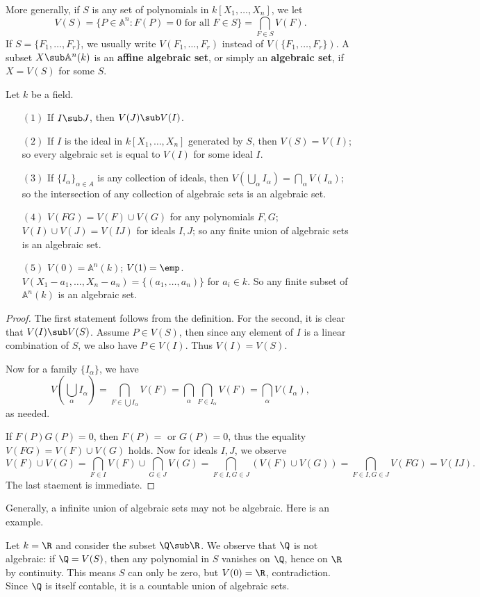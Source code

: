 More generally, if $S$ is any set of polynomials in $k[X_1,\dots,X_n]$, we let 
\[V(S)=\{P\in\mathbb{A}^n:F(P)=0\text{ for all }F\in S\}=\bigcap_{F\in S}V(F).\]
If $S=\{F_1,\dots,F_r\}$, we usually write $V(F_1,\dots,F_r)$ instead of $V(\{F_1,\dots,F_r\})$. A subset $X\sub\mathbb{A}^n(k)$ is an \textbf{affine algebraic set}, or simply an \textbf{algebraic set}, if $X=V(S)$ for some $S$.
\begin{proposition}
Let $k$ be a field.
\begin{itemize}
\item[$(1)$] If $I\sub J$, then $V(J)\sub V(I)$.
\item[$(2)$] If $I$ is the ideal in $k[X_1,\dots,X_n]$ generated by $S$, then $V(S)=V(I)$; so every algebraic set is equal to $V(I)$ for some ideal $I$.
\item[$(3)$] If $\{I_\alpha\}_{\alpha\in A}$ is any collection of ideals, then $V(\bigcup_\alpha I_\alpha)=\bigcap_\alpha V(I_\alpha)$; so the intersection of any collection of algebraic sets is an algebraic set. 
\item[$(4)$] $V(FG)=V(F)\cup V(G)$ for any polynomials $F,G$; $V(I)\cup V(J)=V(IJ)$ for ideals $I,J$; so any finite union of algebraic sets is an algebraic set.
\item[$(5)$] $V(0)=\mathbb{A}^n(k)$; $V(1)=\emp$. $V(X_1-a_1,\dots,X_n-a_n)=\{(a_1,\dots,a_n)\}$ for $a_i\in k$. So any finite subset of $\mathbb{A}^n(k)$ is an algebraic set.
\end{itemize}
\end{proposition}
\begin{proof}
The first statement follows from the definition. For the second, it is clear that $V(I)\sub V(S)$. Assume $P\in V(S)$, then since any element of $I$ is a linear combination of $S$, we also have $P\in V(I)$. Thus $V(I)=V(S)$.\par
Now for a family $\{I_\alpha\}$, we have
\[V(\bigcup_\alpha I_\alpha)=\bigcap_{F\in\bigcup I_\alpha}V(F)=\bigcap_{\alpha}\bigcap_{F\in I_\alpha}V(F)=\bigcap_{\alpha}V(I_\alpha),\]
as needed.\par
If $F(P)G(P)=0$, then $F(P)=$ or $G(P)=0$, thus the equality $V(FG)=V(F)\cup V(G)$ holds. Now for ideals $I,J$, we observe
\[V(F)\cup V(G)=\bigcap_{F\in I}V(F)\cup\bigcap_{G\in J}V(G)=\bigcap_{F\in I,G\in J}(V(F)\cup V(G))=\bigcap_{F\in I,G\in J}V(FG)=V(IJ).\]
The last staement is immediate.
\end{proof}
Generally, a infinite union of algebraic sets may not be algebraic. Here is an example.
\begin{example}
Let $k=\R$ and consider the subset $\Q\sub\R$. We observe that $\Q$ is not algebraic: if $\Q=V(S)$, then any polynomial in $S$ vanishes on $\Q$, hence on $\R$ by continuity. This means $S$ can only be zero, but $V(0)=\R$, contradiction. Since $\Q$ is itself contable, it is a countable union of algebraic sets.
\end{example}
